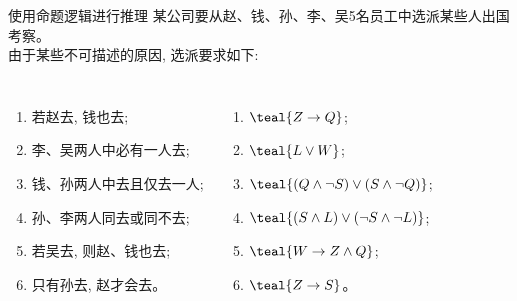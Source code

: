 \begin{frame}{}
  \begin{center}

    \vspace{0.30cm}
  \end{center}
\end{frame}

\begin{frame}{}
  \begin{exampleblock}{使用命题逻辑进行推理}
    某公司要从赵、钱、孙、李、吴5名员工中选派某些人出国考察。\\
    由于某些不可描述的原因, 选派要求如下:

    \begin{columns}
        \begin{enumerate}[(1)]
          \item 若赵去, 钱也去;
          \item 李、吴两人中必有一人去;
          \item 钱、孙两人中去且仅去一人;
          \item 孙、李两人同去或同不去;
          \item 若吴去, 则赵、钱也去;
          \item 只有孙去, 赵才会去。
        \end{enumerate}
        \begin{enumerate}[(1)]
          \item $\teal{Z \to Q}$;
          \item $\teal{L \lor W}$;
          \item $\teal{(Q \land \lnot S) \lor (S \land \lnot Q)}$;
          \item $\teal{(S \land L) \lor (\lnot S \land \lnot L)}$;
          \item $\teal{W \to Z \land Q}$;
          \item $\teal{Z \to S}$。
        \end{enumerate}
    \end{columns}

    \vspace{0.50cm}
  \end{exampleblock}
\end{frame}

